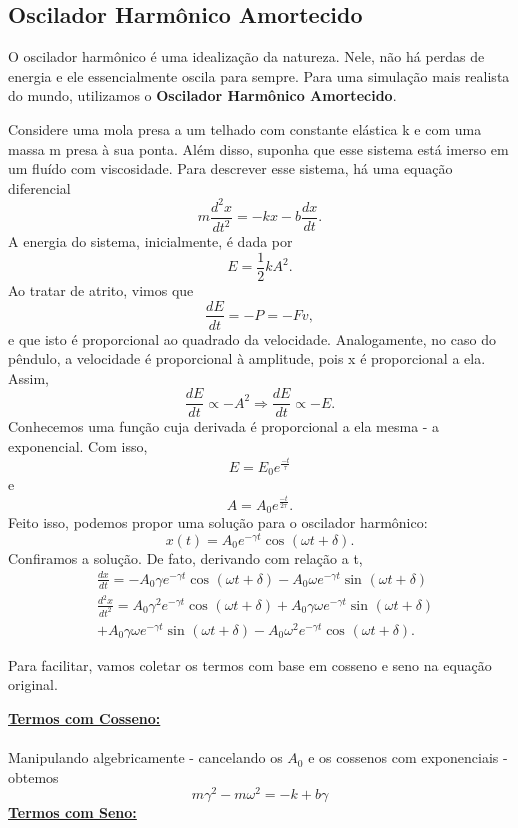 \documentclass[physicsII_notes.tex]{subfiles}
\begin{document}
\subsection{Oscilador Harmônico Amortecido}
O oscilador harmônico é uma idealização da natureza. Nele, não há perdas de energia e ele essencialmente
oscila para sempre. Para uma simulação mais realista do mundo, utilizamos o \textbf{Oscilador Harmônico Amortecido}.

Considere uma mola presa a um telhado com constante elástica k e com uma massa m presa à sua ponta. Além disso, suponha que
esse sistema está imerso em um fluído com viscosidade. Para descrever esse sistema, há uma equação diferencial
\[
	m \frac{d^{2}x}{dt^{2}} = -kx - b \frac{dx}{dt}.
\]
A energia do sistema, inicialmente, é dada por
\[
	E = \frac{1}{2}kA^{2}.
\]
Ao tratar de atrito, vimos que
\[
	\frac{dE}{dt} = - P = - Fv,
\]
e que isto é proporcional ao quadrado da velocidade. Analogamente, no caso do pêndulo, a velocidade é proporcional à amplitude, pois x
é proporcional a ela. Assim,
\[
	\frac{dE}{dt}\propto -A^{2} \Rightarrow \frac{dE}{dt}\propto -E.
\]
Conhecemos uma função cuja derivada é proporcional a ela mesma - a exponencial. Com isso,
\[
	E = E_{0} e^{\frac{-t}{\tau }}
\]
e
\[
	A = A_{0} e^{\frac{-t}{2\tau }}.
\]
Feito isso, podemos propor uma solução para o oscilador harmônico:
\[
	x(t) = A_{0}e^{-\gamma t}\cos^{}{(\omega t + \delta )}.
\]
Confiramos a solução. De fato, derivando com relação a t,
\begin{align*}
	 & \frac{dx}{dt} = -A_{0}\gamma e^{-\gamma t}\cos^{}{(\omega t + \delta )}-A_{0}\omega e^{-\gamma t}\sin^{}{(\omega t + \delta )}                     \\
	 & \frac{d^{2}x}{dt^{2}} = A_{0}\gamma ^{2}e^{-\gamma t}\cos^{}{(\omega t + \delta )} + A_{0}\gamma \omega e^{-\gamma t}\sin^{}{(\omega t + \delta )} \\
	 & +A_{0}\gamma\omega e^{-\gamma t}\sin^{}{(\omega t+\delta )}-A_{0}\omega ^{2}e^{-\gamma t}\cos^{}{(\omega t + \delta )}.
\end{align*}

Para facilitar, vamos coletar os termos com base em cosseno e seno na equação original.

\textbf{\underline{Termos com Cosseno:}}
\paragraph{}  Manipulando algebricamente - cancelando os \(A_{0}\) e os cossenos com exponenciais - obtemos
\[
	m\gamma ^{2} - m\omega^{2} = -k + b\gamma
\]
\newpage
\textbf{\underline{Termos com Seno:}}
\end{document}
